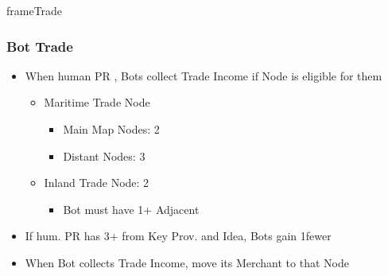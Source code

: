 \documentclass[10pt]{article}
\newlength{\fhTrade} \setlength\fhTrade{43.5\baselineskip}
\begin{document}
\begin{dynamiccontents*}{frameTrade}
\begin{eubox}{\fhTrade}
{	\subsubsection*{Bot Trade }
	\begin{itemize}
		\item When human PR , Bots collect Trade Income if Node is eligible for them
		\begin{itemize}
			\item Maritime Trade Node
			\begin{itemize}
				\item Main Map Nodes: 2\botpower
				\item Distant Nodes: 3\botpower
			\end{itemize}
			\item Inland Trade Node: 2\botpower
			\begin{itemize}
				\item Bot must have 1+ Adjacent \town
			\end{itemize}
		\end{itemize}
		\item If hum. PR has 3+ \tradepower from Key Prov. and  Idea, Bots gain 1\botpower fewer
		\item When Bot collects Trade Income, move its Merchant to that Node	
	\end{itemize}
	}
\end{eubox}\end{dynamiccontents*}
\end{document}
